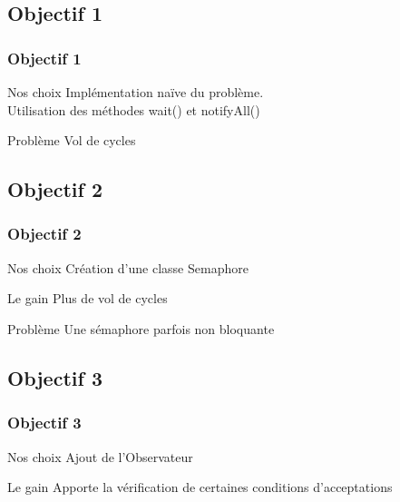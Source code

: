 \documentclass{beamer}
\begin{document}
    \subsection{Objectif 1}
    \begin{frame}
        \frametitle{Objectif 1}
        \begin{block}{Nos choix}
            Implémentation naïve du problème.\\
            Utilisation des méthodes wait() et notifyAll()
        \end{block}

        \begin{alertblock}{Problème}
            Vol de cycles
        \end{alertblock}
    \end{frame}


    \subsection{Objectif 2}
    \begin{frame}
        \frametitle{Objectif 2}
        \begin{block}{Nos choix}
            Création d'une classe Semaphore
        \end{block}

        \begin{exampleblock}{Le gain}
            Plus de vol de cycles
        \end{exampleblock}

        \begin{alertblock}{Problème}
            Une sémaphore parfois non bloquante
        \end{alertblock}
    \end{frame}


    \subsection{Objectif 3}
    \begin{frame}
        \frametitle{Objectif 3}
        \begin{block}{Nos choix}
            Ajout de l'Observateur
        \end{block}

        \begin{exampleblock}{Le gain}
            Apporte la vérification de certaines conditions d'acceptations
        \end{exampleblock}
    \end{frame}
\end{document}
